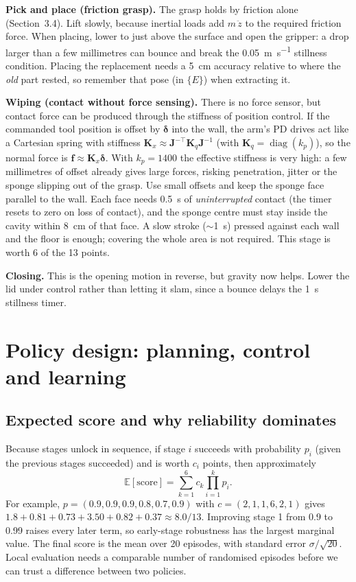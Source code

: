 \documentclass[10pt,a4paper]{article}
\begin{document}
\textbf{Pick and place (friction grasp).} The grasp holds by friction alone (Section~3.4). Lift slowly, because inertial loads add $m\,\ddot z$ to the required friction force. When placing, lower to just above the surface and open the gripper: a drop larger than a few millimetres can bounce and break the \SI{0.05}{\metre\per\second} stillness condition. Placing the replacement needs a \SI{5}{\centi\metre} accuracy relative to where the \emph{old} part rested, so remember that pose (in $\{E\}$) when extracting it.

\textbf{Wiping (contact without force sensing).} There is no force sensor, but contact force can be produced through the stiffness of position control. If the commanded tool position is offset by $\bm\delta$ into the wall, the arm's PD drives act like a Cartesian spring with stiffness $\bm K_x\approx\bm J^{-\top}\bm K_q\bm J^{-1}$ (with $\bm K_q=\operatorname{diag}(k_p)$), so the normal force is $\bm f\approx\bm K_x\bm\delta$. With $k_p=1400$ the effective stiffness is very high: a few millimetres of offset already gives large forces, risking penetration, jitter or the sponge slipping out of the grasp. Use small offsets and keep the sponge face parallel to the wall. Each face needs \SI{0.5}{\second} of \emph{uninterrupted} contact (the timer resets to zero on loss of contact), and the sponge centre must stay inside the cavity within \SI{8}{\centi\metre} of that face. A slow stroke ($\sim$\SI{1}{\second}) pressed against each wall and the floor is enough; covering the whole area is not required. This stage is worth 6 of the 13 points.

\textbf{Closing.} This is the opening motion in reverse, but gravity now helps. Lower the lid under control rather than letting it slam, since a bounce delays the \SI{1}{\second} stillness timer.

\section{Policy design: planning, control and learning}\label{sec:learning}
\subsection{Expected score and why reliability dominates}
Because stages unlock in sequence, if stage $i$ succeeds with probability $p_i$ (given the previous stages succeeded) and is worth $c_i$ points, then approximately
\begin{equation}
\mathbb E[\text{score}]=\sum_{k=1}^{6}c_k\prod_{i=1}^{k}p_i .
\end{equation}
For example, $p=(0.9,0.9,0.9,0.8,0.7,0.9)$ with $c=(2,1,1,6,2,1)$ gives $1.8+0.81+0.73+3.50+0.82+0.37\approx8.0/13$. Improving stage 1 from 0.9 to 0.99 raises every later term, so early-stage robustness has the largest marginal value. The final score is the mean over 20 episodes, with standard error $\sigma/\sqrt{20}$. Local evaluation needs a comparable number of randomised episodes before we can trust a difference between two policies.
\end{document}
